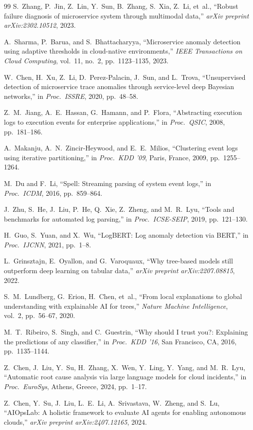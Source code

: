 \documentclass[5p, times]{elsarticle}
\begin{document}
\begin{thebibliography}{99}
S.~Zhang, P.~Jin, Z.~Lin, Y.~Sun, B.~Zhang, S.~Xia, Z.~Li,
et~al., ``Robust failure diagnosis of microservice system through
multimodal data,'' \textit{arXiv preprint arXiv:2302.10512}, 2023.

A.~Sharma, P.~Barua, and S.~Bhattacharyya, ``Microservice anomaly
detection using adaptive thresholds in cloud-native environments,''
\textit{IEEE Transactions on Cloud Computing}, vol.~11, no.~2,
pp.~1123--1135, 2023.

W.~Chen, H.~Xu, Z.~Li, D.~Perez-Palacin, J.~Sun, and L.~Trova,
``Unsupervised detection of microservice trace anomalies through
service-level deep Bayesian networks,'' in \textit{Proc.\ ISSRE},
2020, pp.~48--58.

Z.~M.~Jiang, A.~E.~Hassan, G.~Hamann, and P.~Flora,
``Abstracting execution logs to execution events for enterprise
applications,'' in \textit{Proc.\ QSIC}, 2008, pp.~181--186.

A.~Makanju, A.~N.~Zincir-Heywood, and E.~E.~Milios,
``Clustering event logs using iterative partitioning,'' in
\textit{Proc.\ KDD '09}, Paris, France, 2009, pp.~1255--1264.

M.~Du and F.~Li, ``Spell: Streaming parsing of system event logs,''
in \textit{Proc.\ ICDM}, 2016, pp.~859--864.

J.~Zhu, S.~He, J.~Liu, P.~He, Q.~Xie, Z.~Zheng, and M.~R.~Lyu,
``Tools and benchmarks for automated log parsing,'' in
\textit{Proc.\ ICSE-SEIP}, 2019, pp.~121--130.

H.~Guo, S.~Yuan, and X.~Wu, ``LogBERT: Log anomaly detection via
BERT,'' in \textit{Proc.\ IJCNN}, 2021, pp.~1--8.

L.~Grinsztajn, E.~Oyallon, and G.~Varoquaux, ``Why tree-based
models still outperform deep learning on tabular data,''
\textit{arXiv preprint arXiv:2207.08815}, 2022.

S.~M.~Lundberg, G.~Erion, H.~Chen, et~al., ``From local
explanations to global understanding with explainable AI for
trees,'' \textit{Nature Machine Intelligence}, vol.~2,
pp.~56--67, 2020.

M.~T.~Ribeiro, S.~Singh, and C.~Guestrin, ``Why should I trust
you?: Explaining the predictions of any classifier,'' in
\textit{Proc.\ KDD '16}, San Francisco, CA, 2016,
pp.~1135--1144.

Z.~Chen, J.~Liu, Y.~Su, H.~Zhang, X.~Wen, Y.~Ling, Y.~Yang, and
M.~R.~Lyu, ``Automatic root cause analysis via large language
models for cloud incidents,'' in \textit{Proc.\ EuroSys}, Athens,
Greece, 2024, pp.~1--17.

Z.~Chen, Y.~Su, J.~Liu, L.~E.~Li, A.~Srivastava, W.~Zheng, and
S.~Lu, ``AIOpsLab: A holistic framework to evaluate AI agents for
enabling autonomous clouds,'' \textit{arXiv preprint
arXiv:2407.12165}, 2024.

\end{thebibliography}
\end{document}

